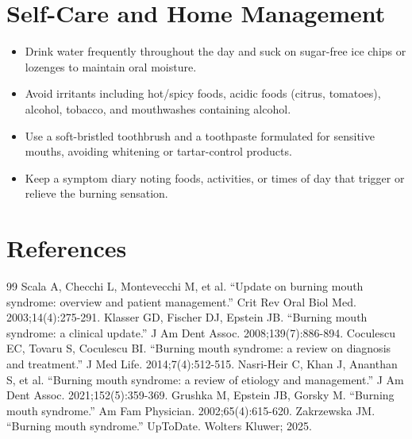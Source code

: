 \section*{Self-Care and Home Management}
\begin{itemize}
 \item Drink water frequently throughout the day and suck on sugar-free ice chips or lozenges to maintain oral moisture.
 \item Avoid irritants including hot/spicy foods, acidic foods (citrus, tomatoes), alcohol, tobacco, and mouthwashes containing alcohol.
 \item Use a soft-bristled toothbrush and a toothpaste formulated for sensitive mouths, avoiding whitening or tartar-control products.
 \item Keep a symptom diary noting foods, activities, or times of day that trigger or relieve the burning sensation.
\end{itemize}

\section*{References}
\begin{thebibliography}{99}
 Scala A, Checchi L, Montevecchi M, et al. ``Update on burning mouth syndrome: overview and patient management.'' Crit Rev Oral Biol Med. 2003;14(4):275-291.
 Klasser GD, Fischer DJ, Epstein JB. ``Burning mouth syndrome: a clinical update.'' J Am Dent Assoc. 2008;139(7):886-894.
 Coculescu EC, Tovaru S, Coculescu BI. ``Burning mouth syndrome: a review on diagnosis and treatment.'' J Med Life. 2014;7(4):512-515.
 Nasri-Heir C, Khan J, Ananthan S, et al. ``Burning mouth syndrome: a review of etiology and management.'' J Am Dent Assoc. 2021;152(5):359-369.
 Grushka M, Epstein JB, Gorsky M. ``Burning mouth syndrome.'' Am Fam Physician. 2002;65(4):615-620.
 Zakrzewska JM. ``Burning mouth syndrome.'' UpToDate. Wolters Kluwer; 2025.
\end{thebibliography}
